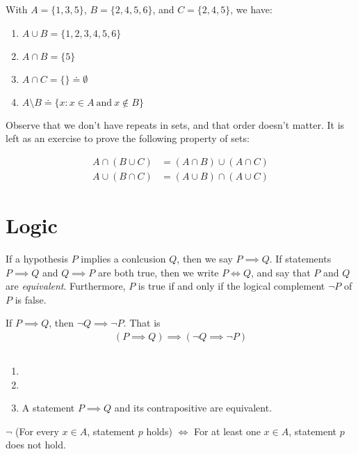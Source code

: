 \begin{examples}
	With $A = \{1,3,5\}$, $B  = \{2,4,5,6\}$, 
	and $C = \{2,4,5\}$, we have:
	\begin{enumerate}	
		\item $A \cup B = \{1,2,3,4,5,6\}$
		\item	$A \cap B = \{5\}$
		\item	$A \cap C  = \{\} \doteq \emptyset$
		\item $A \setminus B  \doteq
			\{ x: x \in A \ \text{and} \ x \not \in B\} $
	\end{enumerate}
\end{examples}
Observe that we don't have repeats in sets, and that order doesn't matter.
It is left as an exercise to prove the following property of sets:
\begin{lemma}
	\begin{equation*}
		\begin{split}
			A \cap (B \cup C) &= (A \cap B)  \cup (A \cap C) \\
			A \cup (B \cap C) &= (A \cup B)  \cap (A \cup C) 
		\end{split}
	\end{equation*}
\end{lemma}
\section{Logic} 
\begin{definition}
	If a hypothesis $P$ implies a conlcusion $Q$, then we say $P \implies Q$.
	If statements $P \implies Q$ and $Q \implies P$ are both true, then we 
	write $P \iff Q$, and say that $P$ and $Q$ are \emph{equivalent}.
	Furthermore, $P$ is true if and only if the logical complement $\neg P$ of $P$ is
	false.
\end{definition}
\begin{lemma}[Contrapositive]\label{lem:contrapositive}
	If $P \implies Q $, then $\neg Q \implies \neg P$. That is
	\begin{equation*}
		\begin{split}
			( P \implies Q )  \implies \left( \neg Q  \implies \neg P\right) 
		\end{split}
	\end{equation*}
\end{lemma}
\begin{examples} $ $
	\begin{enumerate}		
		\item {} 
		\item {}
	\item A statement $P \implies Q$ and its contrapositive are equivalent.\end{enumerate}
\end{examples}
\begin{corollary}
	$\neg$ (For every $x \in A$, statement $p$ holds)
	$\iff$ For at least one $x \in A$, statement $p$ does not hold.
\end{corollary}
